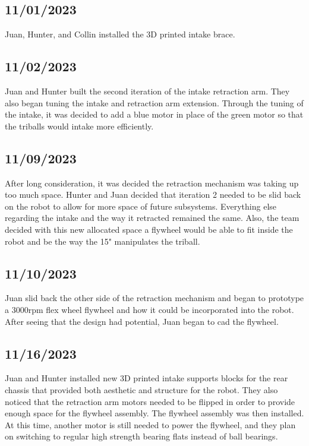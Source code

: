 \subsection{11/01/2023}
Juan, Hunter, and Collin installed the 3D printed intake brace.

\subsection{11/02/2023}
Juan and Hunter built the second iteration of the intake retraction arm. They also began tuning the intake
and retraction arm extension. Through the tuning of the intake, it was decided to add a blue motor in place of
the green motor so that the triballs would intake more efficiently.

\subsection{11/09/2023}
After long consideration, it was decided the retraction mechanism was taking up too much space. Hunter and
Juan decided that iteration 2 needed to be slid back on the robot to allow for more space of future subsystems.
Everything else regarding the intake and the way it retracted remained the same. Also, the team decided with
this new allocated space a flywheel would be able to fit inside the robot and be the way the 15" manipulates
the triball.


\subsection{11/10/2023}
Juan slid back the other side of the retraction mechanism and began to prototype a 3000rpm flex wheel flywheel
and how it could be incorporated into the robot. After seeing that the design had potential, Juan began to
cad the flywheel.

\subsection{11/16/2023}
Juan and Hunter installed new 3D printed intake supports blocks for the rear chassis that
provided both aesthetic and structure for the robot. They also noticed that the retraction arm motors
needed to be flipped in order to provide enough space for the flywheel assembly. The flywheel assembly was
then installed. At this time, another motor is still needed to power the flywheel, and they plan on switching
to regular high strength bearing flats instead of ball bearings.

